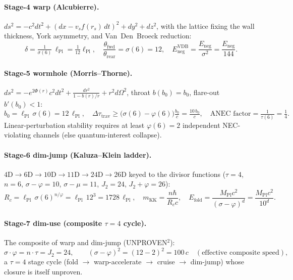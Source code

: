 \paragraph{Stage-4 warp (Alcubierre).}
$ds^2=-c^2dt^2+(dx-v_s f(r_s)\,dt)^2+dy^2+dz^2$, with the lattice fixing
the wall thickness, York asymmetry, and Van~Den~Broeck reduction:
\begin{equation}
\delta=\tfrac1{\sigma(6)}\,\ell_{\text{Pl}}=\tfrac1{12}\ell_{\text{Pl}},
\quad
\frac{\theta_{\text{fwd}}}{\theta_{\text{rear}}}=\sigma(6)=12,
\quad
E_{\text{neg}}^{\text{VDB}}=\frac{E_{\text{neg}}}{\sigma^2}=\frac{E_{\text{neg}}}{144}.
\label{eq:s47-warp}
\end{equation}
\paragraph{Stage-5 wormhole (Morris--Thorne).}
$ds^2=-e^{2\Phi(r)}c^2dt^2+\frac{dr^2}{1-b(r)/r}+r^2d\Omega^2$, throat
$b(b_0)=b_0$, flare-out $b'(b_0)<1$:
\begin{equation}
b_0=\ell_{\text{Pl}}\,\sigma(6)=12\,\ell_{\text{Pl}},
\quad
\Delta\tau_{\text{trav}}\ge\bigl(\sigma(6)-\varphi(6)\bigr)\tfrac{b_0}{c}=\tfrac{10\,b_0}{c},
\quad
\text{ANEC factor}=\tfrac1{\tau(6)}=\tfrac14.
\label{eq:s47-worm}
\end{equation}
Linear-perturbation stability requires at least $\varphi(6)=2$
independent NEC-violating channels (else quantum-interest collapse).
\paragraph{Stage-6 dim-jump (Kaluza--Klein ladder).}
$4\text{D}\to6\text{D}\to10\text{D}\to11\text{D}\to24\text{D}\to26\text{D}$
keyed to the divisor functions ($\tau{=}4$, $n{=}6$, $\sigma{-}\varphi{=}10$,
$\sigma{-}\mu{=}11$, $J_2{=}24$, $J_2{+}\varphi{=}26$):
\begin{equation}
R_c=\ell_{\text{Pl}}\,\sigma(6)^{n/\varphi}=\ell_{\text{Pl}}\,12^3=1728\,\ell_{\text{Pl}},
\quad
m_{\text{KK}}=\frac{n\hbar}{R_c c},
\quad
E_{\text{fold}}=\frac{M_{\text{Pl}}c^2}{(\sigma-\varphi)^d}=\frac{M_{\text{Pl}}c^2}{10^d}.
\label{eq:s47-dim}
\end{equation}
\paragraph{Stage-7 dim-use (composite $\tau{=}4$ cycle).}
The composite of warp and dim-jump (UNPROVEN$^2$):
\begin{equation}
\sigma\!\cdot\!\varphi=n\!\cdot\!\tau=J_2=24,
\qquad
(\sigma-\varphi)^2=(12-2)^2=100\,c
\quad(\text{effective composite speed}),
\label{eq:s47-use}
\end{equation}
a $\tau{=}4$ stage cycle (fold $\to$ warp-accelerate $\to$ cruise $\to$
dim-jump) whose closure is itself unproven.

